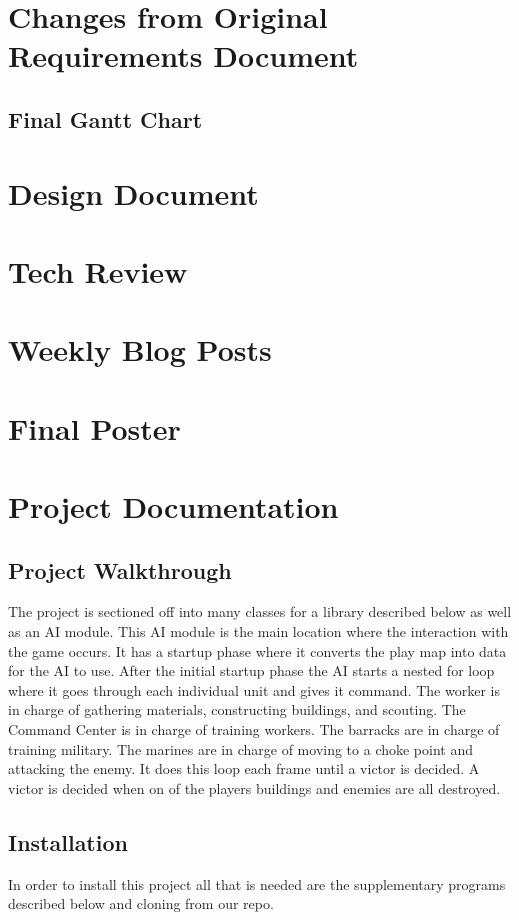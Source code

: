 \documentclass[10pt,letterpaper,onecolumn,draftclsnofoot]{IEEEtran}
\begin{document}
\section{Changes from Original Requirements Document}
\subsection{Final Gantt Chart}

\section{Design Document}

\section{Tech Review}

\section{Weekly Blog Posts}

\section{Final Poster}

\newpage

\section{Project Documentation}
\subsection{Project Walkthrough}
The project is sectioned off into many classes for a library described below as well as an AI module. This AI module is the main location where the interaction with the game occurs. It has a startup phase where it converts the play map into data for the AI to use. After the initial startup phase the AI starts a nested for loop where it goes through each individual unit and gives it command. The worker is in charge of gathering materials, constructing buildings, and scouting. The Command Center is in charge of training workers. The barracks are in charge of training military. The marines are in charge of moving to a choke point and attacking the enemy. It does this loop each frame until a victor is decided. A victor is decided when on of the players buildings and enemies are all destroyed.
\subsection{Installation}
In order to install this project all that is needed are the supplementary programs described below and cloning from our repo.
\end{document}

